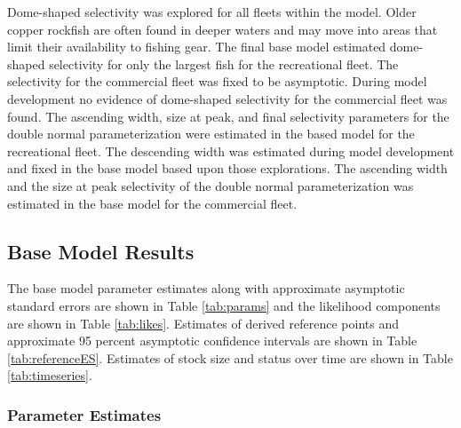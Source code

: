 \documentclass[11pt,
  english,
  a4paper,
]{article}
\begin{document}
\leavevmode\tagmcend\tagstructend\par


Dome-shaped selectivity was explored for all fleets within the model. Older copper rockfish are often found in deeper waters and may move into areas that limit their availability to fishing gear. The final base model estimated dome-shaped selectivity for only the largest fish for the recreational fleet. The selectivity for the commercial fleet was fixed to be asymptotic. During model development no evidence of dome-shaped selectivity for the commercial fleet was found. The ascending width, size at peak, and final selectivity parameters for the double normal parameterization were estimated in the based model for the recreational fleet. The descending width was estimated during model development and fixed in the base model based upon those explorations. The ascending width and the size at peak selectivity of the double normal parameterization was estimated in the base model for the commercial fleet.

\leavevmode\tagmcend\tagstructend\par


\hypertarget{base-model-results}{%
\subsection{Base Model Results}\label{base-model-results}}

\leavevmode\tagmcend\tagstructend


The base model parameter estimates along with approximate asymptotic standard errors are shown in Table \ref{tab:params} and the likelihood components are shown in Table \ref{tab:likes}. Estimates of derived reference points and approximate 95 percent asymptotic confidence intervals are shown in Table \ref{tab:referenceES}. Estimates of stock size and status over time are shown in Table \ref{tab:timeseries}.

\leavevmode\tagmcend\tagstructend\par


\hypertarget{para-estimates}{%
\subsubsection{Parameter Estimates}\label{para-estimates}}
\end{document}

